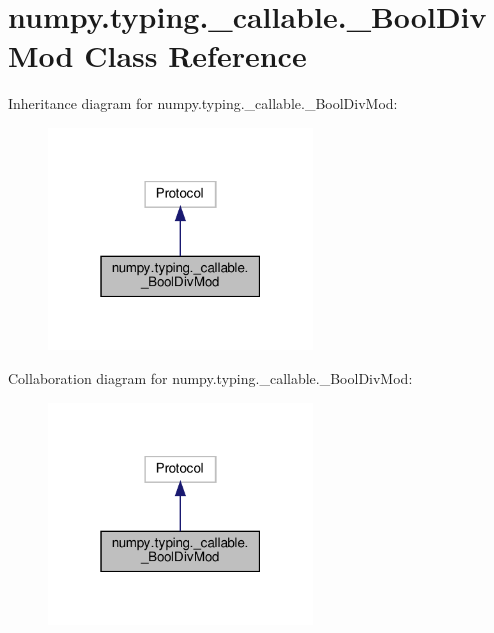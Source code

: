 \hypertarget{classnumpy_1_1typing_1_1__callable_1_1__BoolDivMod}{}\section{numpy.\+typing.\+\_\+callable.\+\_\+\+Bool\+Div\+Mod Class Reference}
\label{classnumpy_1_1typing_1_1__callable_1_1__BoolDivMod}


Inheritance diagram for numpy.\+typing.\+\_\+callable.\+\_\+\+Bool\+Div\+Mod\+:
\nopagebreak
\begin{figure}[H]
\begin{center}
\leavevmode
\includegraphics[width=199pt]{classnumpy_1_1typing_1_1__callable_1_1__BoolDivMod__inherit__graph}
\end{center}
\end{figure}


Collaboration diagram for numpy.\+typing.\+\_\+callable.\+\_\+\+Bool\+Div\+Mod\+:
\nopagebreak
\begin{figure}[H]
\begin{center}
\leavevmode
\includegraphics[width=199pt]{classnumpy_1_1typing_1_1__callable_1_1__BoolDivMod__coll__graph}
\end{center}
\end{figure}
